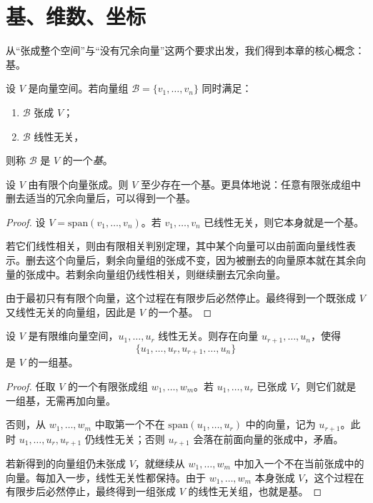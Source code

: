 \section{基、维数、坐标}

从“张成整个空间”与“没有冗余向量”这两个要求出发，我们得到本章的核心概念：基。

\begin{definition}
设 $V$ 是向量空间。若向量组 $\mathcal B=\{v_1,\dots,v_n\}$ 同时满足：
\begin{enumerate}[label=\textnormal{(\arabic*)}]
  \item $\mathcal B$ 张成 $V$；
  \item $\mathcal B$ 线性无关，
\end{enumerate}
则称 $\mathcal B$ 是 $V$ 的一个\emph{基}。
\end{definition}

\begin{theorem}[有限维空间中基的存在]
设 $V$ 由有限个向量张成。则 $V$ 至少存在一个基。更具体地说：任意有限张成组中删去适当的冗余向量后，可以得到一个基。
\end{theorem}

\begin{proof}
设 $V=\mathrm{span}(v_1,\dots,v_n)$。若 $v_1,\dots,v_n$ 已线性无关，则它本身就是一个基。

若它们线性相关，则由有限相关判别定理，其中某个向量可以由前面向量线性表示。删去这个向量后，剩余向量组的张成不变，因为被删去的向量原本就在其余向量的张成中。若剩余向量组仍线性相关，则继续删去冗余向量。

由于最初只有有限个向量，这个过程在有限步后必然停止。最终得到一个既张成 $V$ 又线性无关的向量组，因此是 $V$ 的一个基。
\end{proof}

\begin{proposition}[线性无关组可扩充为基]
设 $V$ 是有限维向量空间，$u_1,\dots,u_r$ 线性无关。则存在向量 $u_{r+1},\dots,u_n$，使得
\[
\{u_1,\dots,u_r,u_{r+1},\dots,u_n\}
\]
是 $V$ 的一组基。
\end{proposition}

\begin{proof}
任取 $V$ 的一个有限张成组 $w_1,\dots,w_m$。若 $u_1,\dots,u_r$ 已张成 $V$，则它们就是一组基，无需再加向量。

否则，从 $w_1,\dots,w_m$ 中取第一个不在 $\mathrm{span}(u_1,\dots,u_r)$ 中的向量，记为 $u_{r+1}$。此时 $u_1,\dots,u_r,u_{r+1}$ 仍线性无关；否则 $u_{r+1}$ 会落在前面向量的张成中，矛盾。

若新得到的向量组仍未张成 $V$，就继续从 $w_1,\dots,w_m$ 中加入一个不在当前张成中的向量。每加入一步，线性无关性都保持。由于 $w_1,\dots,w_m$ 本身张成 $V$，这个过程在有限步后必然停止，最终得到一组张成 $V$ 的线性无关组，也就是基。
\end{proof}

